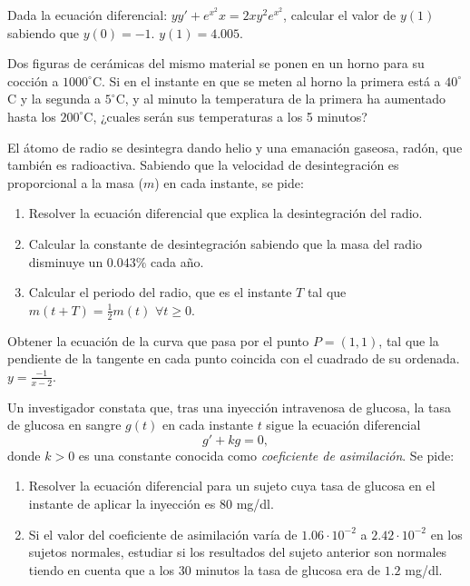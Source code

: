 {Dada la ecuación diferencial: $yy'+ e^{x^2}x = 2xy^2e^{x^2}$, calcular el valor de $y(1)$ sabiendo que $y(0)=-1$.}
{$y(1)=4.005$.}
{}


{Dos figuras de cerámicas del mismo material se ponen en un horno para su cocción a $1000^\circ$C. 
Si en el instante en que se meten al horno la primera está a $40^\circ$C y la segunda a $5^\circ$C, y al minuto la temperatura de la primera ha aumentado hasta los $200^\circ$C, ¿cuales serán sus temperaturas a los 5 minutos?  
}
{
}
{}


{El átomo de radio se desintegra dando helio y una emanación gaseosa, radón, que también es radioactiva. 
Sabiendo que la velocidad de desintegración es proporcional a la masa ($m$) en cada instante, se pide:
\begin{enumerate}
\item Resolver la ecuación diferencial que explica la desintegración del radio.
\item Calcular la constante de desintegración sabiendo que la masa del radio disminuye un $0.043\%$ cada año.
\item Calcular el periodo del radio, que es el instante $T$ tal que  $m(t+T)=\frac{1}{2}m(t)$ $\forall t\geq 0$.
\end{enumerate} 
}
{
}
{}


{Obtener la ecuación de la curva que pasa por el punto $P=(1,1)$, tal que la pendiente de la tangente en cada punto coincida con el cuadrado de su ordenada.
}
{$y=\frac{-1}{x-2}$.
}
{}


{Un investigador constata que, tras una inyección intravenosa de glucosa, la tasa de glucosa en sangre $g(t)$ en cada instante $t$ sigue la ecuación diferencial
\[
g'+kg=0,
\] 
donde $k>0$ es una constante conocida como \emph{coeficiente de asimilación}. Se pide:
\begin{enumerate}
\item Resolver la ecuación diferencial para un sujeto cuya tasa de glucosa en el instante de aplicar la inyección es 80 mg/dl.
\item Si el valor del coeficiente de asimilación varía de $1.06\cdot 10^{-2}$ a $2.42\cdot 10^{-2}$ en los sujetos normales, estudiar si los resultados del sujeto anterior son normales tiendo en cuenta que a los 30 minutos la tasa de glucosa era de $1.2$ mg/dl.
\end{enumerate}
}
{
}
{}


